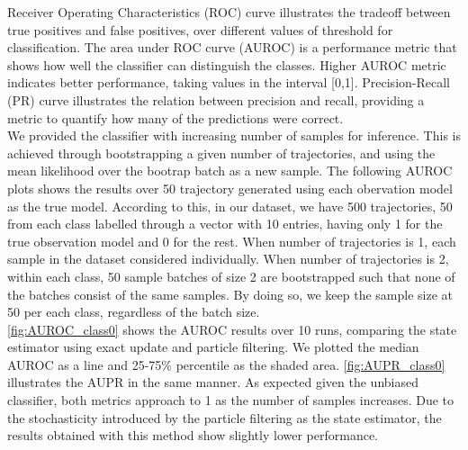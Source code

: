 Receiver Operating Characteristics (ROC) curve illustrates the tradeoff between true positives and false positives, over different values of threshold for classification. \cite{Robinson2008} The area under ROC curve (AUROC) is a performance metric that shows how well the classifier can distinguish the classes. Higher AUROC metric indicates better performance, taking values in the interval [0,1]. Precision-Recall (PR) curve illustrates the relation between precision and recall, providing a metric to quantify how many of the predictions were correct. \cite{Boyd2013}\\
We provided the classifier with increasing number of samples for inference. This is achieved through bootstrapping a given number of trajectories, and using the mean likelihood over the bootrap batch as a new sample. The following AUROC plots shows the results over 50 trajectory generated using each obervation model as the true model. According to this, in our dataset, we have 500 trajectories, 50 from each class labelled through a vector with 10 entries, having only 1 for the true observation model and 0 for the rest. When number of trajectories is 1, each sample in the dataset considered individually. When number of trajectories is 2, within each class, 50 sample batches of size 2 are bootstrapped such that none of the batches consist of the same samples. By doing so, we keep the sample size at 50 per each class, regardless of the batch size. \\
\autoref{fig:AUROC_class0} shows the AUROC results over 10 runs, comparing the state estimator using exact update and particle filtering. We plotted the median AUROC as a line and 25-75\% percentile as the shaded area. \autoref{fig:AUPR_class0} illustrates the AUPR in the same manner. As expected given the unbiased classifier, both metrics approach to 1 as the number of samples increases. Due to the stochasticity introduced by the particle filtering as the state estimator, the results obtained with this method show slightly lower performance. 
